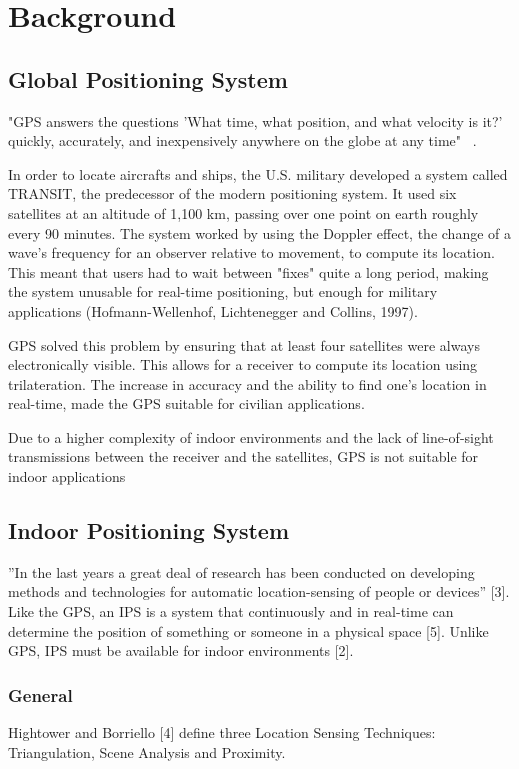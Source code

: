 \chapter{Background}

\section{Global Positioning System}
"GPS answers the questions 'What time, what position, and what velocity is it?' quickly, accurately, and inexpensively anywhere on the globe at any time" ~\cite{Hofmann}.  

In order to locate aircrafts and ships, the U.S. military developed a system called TRANSIT, the predecessor of the modern positioning system. It used six satellites at an altitude of 1,100 km, passing over one point on earth roughly every 90 minutes. The system worked by using the Doppler effect, the change of a wave's frequency for an observer relative to movement, to compute its location. This meant that users had to wait between "fixes" quite a long period, making the system unusable for real-time positioning, but enough for military applications (Hofmann-Wellenhof, Lichtenegger and Collins, 1997). 

GPS solved this problem by ensuring that at least four satellites were always electronically visible. This allows for a receiver to compute its location using trilateration. The increase in accuracy and the ability to find one’s location in real-time, made the GPS suitable for civilian applications. 

Due to a higher complexity of indoor environments and the lack of line-of-sight transmissions between the receiver and the satellites, GPS is not suitable for indoor applications ~\cite{Gu}

\section{Indoor Positioning System}
”In the last years a great deal of research has been conducted on developing methods and technologies for automatic location-sensing of people or devices” [3]. Like the GPS, an IPS is a system that continuously and in real-time can determine the position of something or someone in a physical space [5]. Unlike GPS, IPS must be available for indoor environments [2]. 

\subsection{General}
Hightower and Borriello [4] define three Location Sensing Techniques: Triangulation, Scene Analysis and Proximity. 

